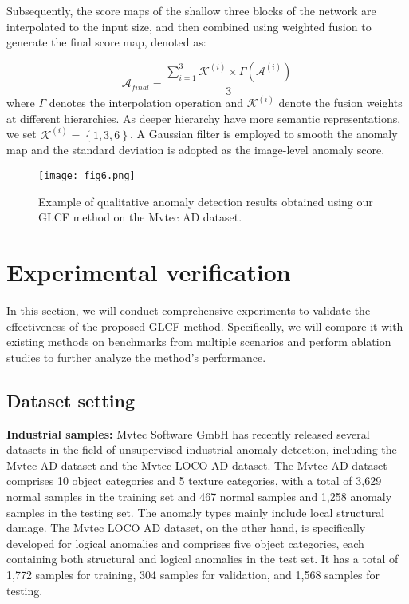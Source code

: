 \documentclass[lettersize,journal]{IEEEtran}
\begin{document}
Subsequently, the score maps of the shallow three blocks of the network are interpolated to the input size, and then combined using weighted fusion to generate the final score map, denoted as:

\begin{equation}
\mathcal{A}_{final}=\frac{\sum_{i=1}^{3} \mathcal{K}^{(i)}\times \Gamma\left ( \mathcal{A}^{(i)}\right ) }{3} 
\end{equation}
where $\Gamma$ denotes the interpolation operation and $\mathcal{K}^{(i)}$ denote the fusion weights at different hierarchies. As deeper hierarchy have more semantic representations, we set $\mathcal{K}^{(i)}=\left \{ {1,3,6} \right \} $. A Gaussian filter is employed to smooth the anomaly map and the standard deviation is adopted as the image-level anomaly score.


\begin{figure*}[t]
\centerline{\texttt{[image: fig6.png]}}
\caption[width=\textwidth]{
Example of qualitative anomaly detection results obtained using our GLCF method on the Mvtec AD dataset.}
\end{figure*}

\section{Experimental verification}

In this section, we will conduct comprehensive experiments to validate the effectiveness of the proposed GLCF method. Specifically, we will compare it with existing methods on benchmarks from multiple scenarios and perform ablation studies to further analyze the method's performance.

\subsection{Dataset setting}

\textbf{Industrial samples:} Mvtec Software GmbH has recently released several datasets in the field of unsupervised industrial anomaly detection, including the Mvtec AD dataset\cite{r28} and the Mvtec LOCO AD dataset\cite{r31}. The Mvtec AD dataset comprises 10 object categories and 5 texture categories, with a total of 3,629 normal samples in the training set and 467 normal samples and 1,258 anomaly samples in the testing set. The anomaly types mainly include local structural damage. The Mvtec LOCO AD dataset, on the other hand, is specifically developed for logical anomalies and comprises five object categories, each containing both structural and logical anomalies in the test set. It has a total of 1,772 samples for training, 304 samples for validation, and 1,568 samples for testing.
\end{document}
